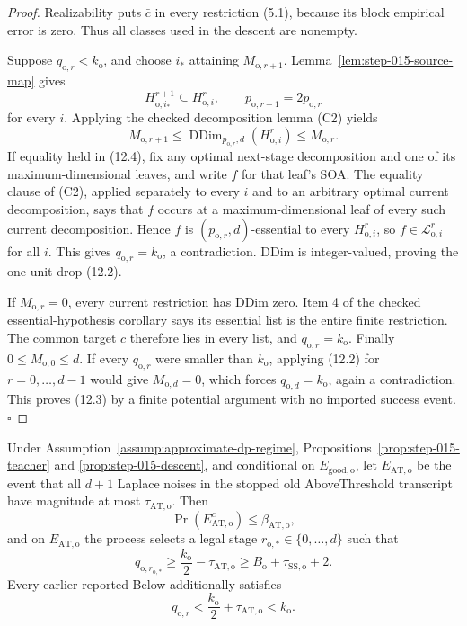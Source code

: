 \begin{proof}
Realizability puts \(\bar c\) in every restriction (5.1), because its
block empirical error is zero. Thus all classes used in the descent are
nonempty.

Suppose \(q_{\mathrm o,r}<k_{\mathrm o}\), and choose \(i_*\) attaining
\(M_{\mathrm o,r+1}\). Lemma~\ref{lem:step-015-source-map} gives
\[
H_{\mathrm o,i_*}^{r+1}\subseteq H_{\mathrm o,i}^{r},
\qquad
p_{\mathrm o,r+1}=2p_{\mathrm o,r}
\]
for every \(i\). Applying the checked decomposition lemma (C2) yields
\[
M_{\mathrm o,r+1}
\le\operatorname{DDim}_{p_{\mathrm o,r},d}
(H_{\mathrm o,i}^r)
\le M_{\mathrm o,r}.
\tag{12.4}
\]
If equality held in (12.4), fix any optimal next-stage decomposition and
one of its maximum-dimensional leaves, and write \(f\) for that leaf's
SOA. The equality clause of (C2), applied separately to every \(i\) and
to an arbitrary optimal current decomposition, says that \(f\) occurs at a
maximum-dimensional leaf of every such current decomposition. Hence \(f\)
is \((p_{\mathrm o,r},d)\)-essential to every
\(H_{\mathrm o,i}^r\), so \(f\in\mathcal L_{\mathrm o,i}^r\) for all
\(i\). This gives \(q_{\mathrm o,r}=k_{\mathrm o}\), a contradiction.
DDim is integer-valued, proving the one-unit drop (12.2).

If \(M_{\mathrm o,r}=0\), every current restriction has DDim zero. Item 4
of the checked essential-hypothesis corollary says its essential list is
the entire finite restriction. The common target \(\bar c\) therefore lies
in every list, and \(q_{\mathrm o,r}=k_{\mathrm o}\).
Finally \(0\le M_{\mathrm o,0}\le d\). If every
\(q_{\mathrm o,r}\) were smaller than \(k_{\mathrm o}\), applying (12.2)
for \(r=0,\ldots,d-1\) would give \(M_{\mathrm o,d}=0\), which forces
\(q_{\mathrm o,d}=k_{\mathrm o}\), again a contradiction. This proves
(12.3) by a finite potential argument with no imported success event.
\(\square\)


\end{proof}

\begin{lemma}\label{lem:step-015-at}
Under Assumption~\ref{assump:approximate-dp-regime},
Propositions~\ref{prop:step-015-teacher} and
\ref{prop:step-015-descent}, and conditional on
\(E_{\mathrm{good,o}}\), let \(E_{\mathrm{AT,o}}\) be the event that all
\(d+1\) Laplace noises in the stopped old AboveThreshold transcript have
magnitude at most \(\tau_{\mathrm{AT,o}}\). Then
\[
\Pr(E_{\mathrm{AT,o}}^c)\le\beta_{\mathrm{AT,o}},
\tag{13.1}
\]
and on \(E_{\mathrm{AT,o}}\) the process selects a legal stage
\(r_{\mathrm o,*}\in\{0,\ldots,d\}\) such that
\[
q_{\mathrm o,r_{\mathrm o,*}}
\ge\frac{k_{\mathrm o}}2-\tau_{\mathrm{AT,o}}
\ge B_{\mathrm o}+\tau_{\mathrm{SS,o}}+2.
\tag{13.2}
\]
Every earlier reported Below additionally satisfies
\[
q_{\mathrm o,r}<\frac{k_{\mathrm o}}2+\tau_{\mathrm{AT,o}}
<k_{\mathrm o}.
\tag{13.3}
\]


\end{lemma}

